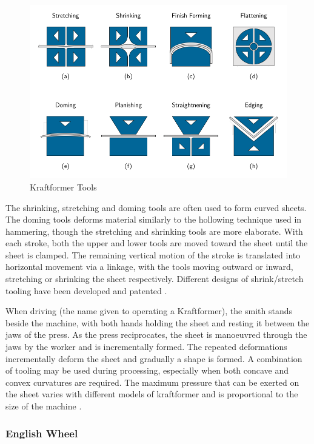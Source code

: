 \begin{figure}[h]
    \centering
    \includegraphics[width=0.7\linewidth]{Images/KraftformerTools4x2.pdf}
    \caption{Kraftformer Tools}
    \label{fig:Kraftformer}
\end{figure}

The shrinking, stretching and doming tools are often used to form curved sheets. The doming tools deforms material similarly to the hollowing technique used in hammering, though the stretching and shrinking tools are more elaborate. With each stroke, both the upper and lower tools are moved toward the sheet until the sheet is clamped. The remaining vertical motion of the stroke is translated into horizontal movement via a linkage, with the tools moving outward or inward, stretching or shrinking the sheet respectively. Different designs of shrink/stretch tooling have been developed and patented \citep{Joyner1943SheetMachine,Rusch2011ShrinkerMachine,Eckold1950ToolElements,EckoldWalter1954ApparatusProfiles}.

When driving (the name given to operating a Kraftformer), the smith stands beside the machine, with both hands holding the sheet and resting it between the jaws of the press. As the press reciprocates, the sheet is manoeuvred through the jaws by the worker and is incrementally formed. The repeated deformations incrementally deform the sheet and gradually a shape is formed. A combination of tooling may be used during processing, especially when both concave and convex curvatures are required. The maximum pressure that can be exerted on the sheet varies with different models of kraftformer and is proportional to the size of the machine \citep{Unknown2020ECKOLDBrochure}.

\subsubsection*{English Wheel}

